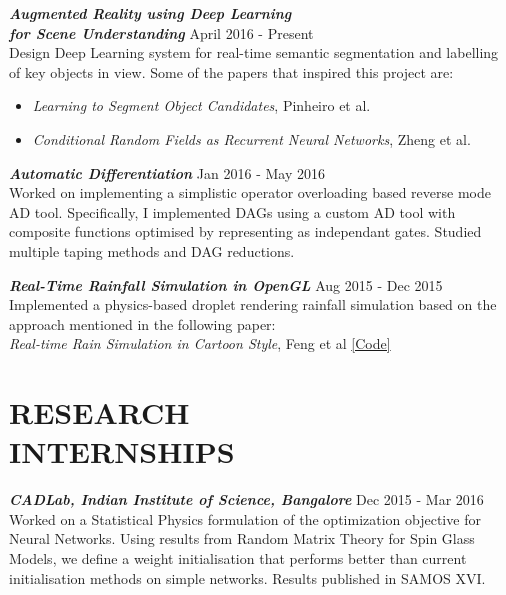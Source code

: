 \documentclass[margin, 10pt]{res} %
\begin{document}
\begin{resume}
{\sl \textbf{Augmented Reality using Deep Learning}} \\
{\sl \textbf{for Scene Understanding}} \hfill April 2016 - Present\\
Design Deep Learning system for real-time semantic segmentation and labelling of key objects in view. Some of the papers that inspired this project are:
\begin{itemize} \itemsep -2pt %
\item {\sl Learning to Segment Object Candidates}, Pinheiro et al.
\item {\sl Conditional Random Fields as Recurrent Neural Networks}, Zheng et al.
\end{itemize} 

{\sl \textbf{Automatic Differentiation}} \hfill Jan 2016 - May 2016 \\
Worked on implementing a simplistic operator overloading based reverse mode AD tool. Specifically, I implemented DAGs using a custom AD tool with composite functions optimised by representing as independant gates. Studied multiple taping methods and DAG reductions.

{\sl \textbf{Real-Time Rainfall Simulation in OpenGL}} \hfill Aug 2015 - Dec 2015 \\
Implemented a physics-based droplet rendering rainfall simulation based on the approach mentioned in the following paper:\\
{\sl Real-time Rain Simulation in Cartoon Style}, Feng et al \href{https://github.com/adityachivu/personal/tree/master/assignments/Computer\%20Graphics/Project}{[Code]}

 
\section{RESEARCH \\ INTERNSHIPS}
{\sl \textbf{CADLab, Indian Institute of Science, Bangalore}} \hfill Dec 2015 - Mar 2016 \\
Worked on a Statistical Physics formulation of the optimization objective for Neural Networks. Using results from Random Matrix Theory for Spin Glass Models, we define a weight initialisation that performs better than current initialisation methods on simple networks. Results published in SAMOS XVI.


\end{resume}
\end{document}

